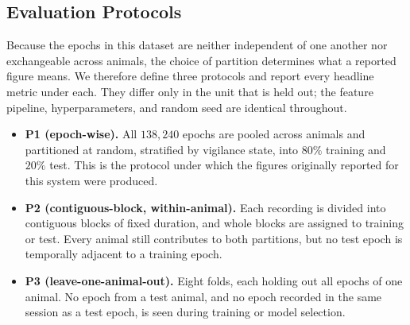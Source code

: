 \subsection{Evaluation Protocols}
\label{subsec:protocols}

Because the epochs in this dataset are neither independent of one another
nor exchangeable across animals, the choice of partition determines what
a reported figure means. We therefore define three protocols and report
every headline metric under each. They differ only in the unit that is
held out; the feature pipeline, hyperparameters, and random seed are
identical throughout.

\begin{itemize}\itemsep2pt\parskip0pt
    \item \textbf{P1 (epoch-wise).} All $138{,}240$ epochs are pooled
    across animals and partitioned at random, stratified by vigilance
    state, into $80\%$ training and $20\%$ test. This is the protocol
    under which the figures originally reported for this system were
    produced.
    \item \textbf{P2 (contiguous-block, within-animal).} Each recording
    is divided into contiguous blocks of
    fixed duration, and whole blocks are assigned to training or test.
    Every animal still contributes to both partitions, but no test epoch
    is temporally adjacent to a training epoch.
    \item \textbf{P3 (leave-one-animal-out).} Eight folds, each holding
    out all epochs of one animal. No epoch from a test animal, and no
    epoch recorded in the same session as a test epoch, is seen during
    training or model selection.
\end{itemize}

